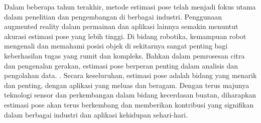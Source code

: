 Dalam beberapa tahun terakhir, metode estimasi pose telah menjadi fokus utama dalam penelitian dan pengembangan di berbagai industri. Penggunaan augmented reality dalam permainan dan aplikasi lainnya semakin menuntut akurasi estimasi pose yang lebih tinggi. Di bidang robotika, kemampuan robot mengenali dan memahami posisi objek di sekitarnya sangat penting bagi keberhasilan tugas yang rumit dan kompleks. Bahkan dalam pemrosesan citra dan pengenalan gerakan, estimasi pose berperan penting dalam analisis dan pengolahan data. \cite{Toshev_2014_CVPR} . Secara keseluruhan, estimasi pose adalah bidang yang menarik dan penting, dengan aplikasi yang meluas dan beragam. Dengan terus majunya teknologi sensor dan perkembangan dalam bidang kecerdasan buatan, diharapkan estimasi pose akan terus berkembang dan memberikan kontribusi yang signifikan dalam berbagai industri dan aplikasi kehidupan sehari-hari.

